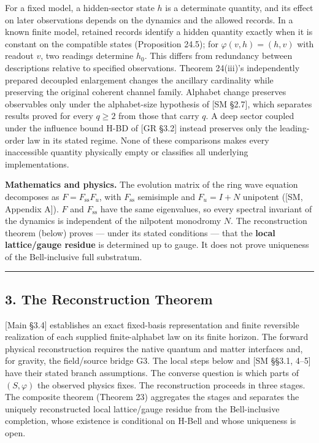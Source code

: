\documentclass[
]{article}
\begin{document}
For a fixed model, a hidden-sector state \(h\) is a determinate
quantity, and its effect on later observations depends on the dynamics
and the allowed records. In a known finite model, retained records
identify a hidden quantity exactly when it is constant on the compatible
states (Proposition 24.5); for \(\varphi(v,h)=(h,v)\) with readout
\(v\), two readings determine \(h_0\). This differs from redundancy
between descriptions relative to specified observations. Theorem
24(iii)'s independently prepared decoupled enlargement changes the
ancillary cardinality while preserving the original coherent channel
family. Alphabet change preserves observables only under the
alphabet-size hypothesis of {[}SM §2.7{]}, which separates results
proved for every \(q\ge2\) from those that carry \(q\). A deep sector
coupled under the influence bound H-BD of {[}GR §3.2{]} instead
preserves only the leading-order law in its stated regime. None of these
comparisons makes every inaccessible quantity physically empty or
classifies all underlying implementations.

\textbf{Mathematics and physics.} The evolution matrix of the ring wave
equation decomposes as \(F = F_{\mathrm{ss}} F_u\), with
\(F_{\mathrm{ss}}\) semisimple and \(F_u = I + N\) unipotent ({[}SM,
Appendix A{]}). \(F\) and \(F_{\mathrm{ss}}\) have the same eigenvalues,
so every spectral invariant of the dynamics is independent of the
nilpotent monodromy \(N\). The reconstruction theorem (below) proves ---
under its stated conditions --- that the \textbf{local lattice/gauge
residue} is determined up to gauge. It does not prove uniqueness of the
Bell-inclusive full substratum.

\begin{center}\rule{0.5\linewidth}{0.5pt}\end{center}

\hypertarget{the-reconstruction-theorem}{%
\subsection{3. The Reconstruction
Theorem}\label{the-reconstruction-theorem}}

{[}Main §3.4{]} establishes an exact fixed-basis representation and
finite reversible realization of each supplied finite-alphabet law on
its finite horizon. The forward physical reconstruction requires the
native quantum and matter interfaces and, for gravity, the field/source
bridge G3. The local steps below and {[}SM §§3.1, 4--5{]} have their
stated branch assumptions. The converse question is which parts of
\((S, \varphi)\) the observed physics fixes. The reconstruction proceeds
in three stages. The composite theorem (Theorem 23) aggregates the
stages and separates the uniquely reconstructed local lattice/gauge
residue from the Bell-inclusive completion, whose existence is
conditional on H-Bell and whose uniqueness is open.
\end{document}
